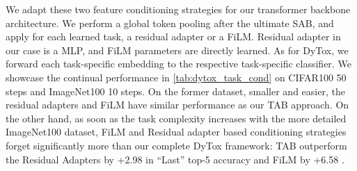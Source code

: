 We adapt these two feature conditioning strategies for our transformer backbone architecture. We
perform a global token pooling after the ultimate SAB, and apply for each learned task, a residual
adapter or a FiLM. Residual adapter in our case is a MLP, and FiLM parameters are directly learned.
As for DyTox, we forward each task-specific embedding to the respective task-specific classifier. We
showcase the continual performance in \autoref{tab:dytox_task_cond} on CIFAR100 50 steps and
ImageNet100 10 steps. On the former dataset, smaller and easier,  the residual adapters and FiLM
have similar performance as our TAB approach. On the other hand, as soon as the task complexity
increases with the more detailed ImageNet100 dataset, FiLM and Residual adapter based conditioning
strategies forget significantly more than our complete DyTox framework: TAB outperform the Residual
Adapters by +2.98 \pp in ``Last'' top-5 accuracy and FiLM by +6.58 \pp.




